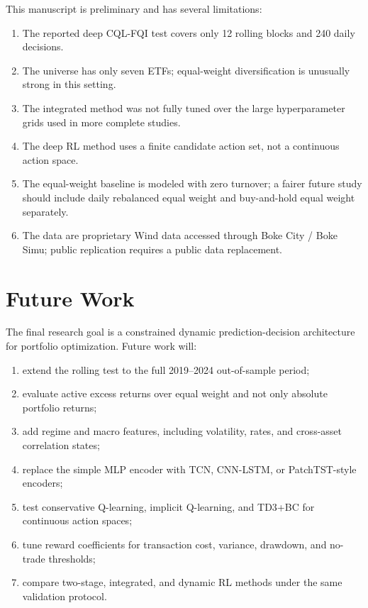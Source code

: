 \documentclass[11pt]{article}
\begin{document}
This manuscript is preliminary and has several limitations:
\begin{enumerate}[leftmargin=*]
    \item The reported deep CQL-FQI test covers only 12 rolling blocks and 240 daily decisions.
    \item The universe has only seven ETFs; equal-weight diversification is unusually strong in this setting.
    \item The integrated method was not fully tuned over the large hyperparameter grids used in more complete studies.
    \item The deep RL method uses a finite candidate action set, not a continuous action space.
    \item The equal-weight baseline is modeled with zero turnover; a fairer future study should include daily rebalanced equal weight and buy-and-hold equal weight separately.
    \item The data are proprietary Wind data accessed through Boke City / Boke Simu; public replication requires a public data replacement.
\end{enumerate}

\section{Future Work}

The final research goal is a constrained dynamic prediction-decision architecture for portfolio optimization. Future work will:
\begin{enumerate}[leftmargin=*]
    \item extend the rolling test to the full 2019--2024 out-of-sample period;
    \item evaluate active excess returns over equal weight and not only absolute portfolio returns;
    \item add regime and macro features, including volatility, rates, and cross-asset correlation states;
    \item replace the simple MLP encoder with TCN, CNN-LSTM, or PatchTST-style encoders;
    \item test conservative Q-learning, implicit Q-learning, and TD3+BC for continuous action spaces;
    \item tune reward coefficients for transaction cost, variance, drawdown, and no-trade thresholds;
    \item compare two-stage, integrated, and dynamic RL methods under the same validation protocol.
\end{enumerate}
\end{document}
